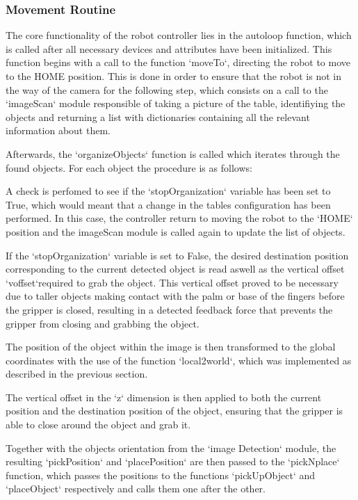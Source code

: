 \subsubsection{Movement Routine}

The core functionality of the robot controller lies in the autoloop function, which is called after all necessary devices and attributes have been initialized. This function begins with a call to the function `moveTo`, directing the robot to move to the HOME position.  This is done in order to ensure that the robot is not in the way of the camera for the following step, which consists on a call to the `imageScan` module responsible of taking a picture of the table, identifiying the objects and returning a list with dictionaries containing all the relevant information about them.

Afterwards, the `organizeObjects` function is called which iterates through the found objects. For each object the procedure is as follows: 

A check is perfomed to see if the `stopOrganization` variable has been set to True, which would meant that a change in the tables configuration has been performed. In this case, the controller return to moving the robot to the `HOME` position and the imageScan module is called again to update the list of objects. 

If the `stopOrganization` variable is set to False, the desired destination position corresponding to the current detected object is read aswell as the vertical offset `voffset`required to grab the object. This vertical offset proved to be necessary due to taller objects making contact with the palm or base of the fingers before the gripper is closed, resulting in a detected feedback force that prevents the gripper from closing and grabbing the object. 

The position of the object within the image is then transformed to the global coordinates with the use of the function `local2world`, which was implemented as described in the previous section.

The vertical offset in the `z` dimension is then  applied to both the current position and the destination position of the object, ensuring that the gripper is able to close around the object and grab it. 

Together with the objects orientation from the `image Detection` module, the resulting `pickPosition` and `placePosition` are then passed  to the `pickNplace` function,  which passes the positions to the functions `pickUpObject` and `placeObject` respectively and calls them one after the other.


